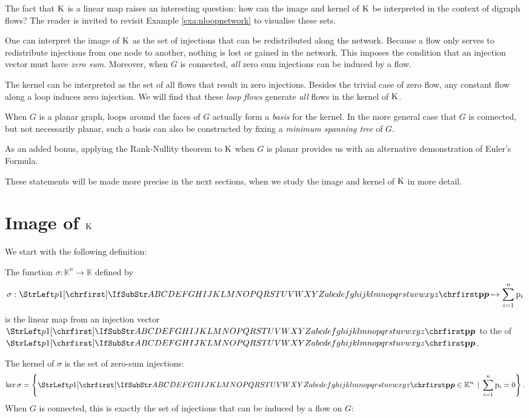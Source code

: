 \documentclass[main.tex]{subfiles}
\begin{document}
The fact that $\text{\textup{K}}$ is a linear map raises an interesting question: how can the image and kernel of $\text{\textup{K}}$ be interpreted in the context of digraph flows?
The reader is invited to revisit Example \ref{exa:nloopnetwork} to visualise these sets.

One can interpret the image of $\text{\textup{K}}$ as the set of injections that can be redistributed along the network. Because a flow only serves to redistribute injections from one node to another, nothing is lost or gained in the network. This imposes the condition that an injection vector must have \emph{zero sum}. Moreover, when $G$ is connected, \emph{all} zero sum injections can be induced by a flow.

The kernel can be interpreted as the set of all flows that result in zero injections. Besides the trivial case of zero flow, any constant flow along a loop induces zero injection. We will find that these \emph{loop flows} generate \emph{all} flows in the kernel of $\text{\textup{K}}$.

When $G$ is a planar graph, loops around the faces of $G$ actually form a \emph{basis} for the kernel. In the more general case that $G$ is connected, but not necessarily planar, such a basis can also be constructed by fixing a \emph{minimum spanning tree} of $G$.

As an added bonus, applying the Rank-Nullity theorem to $\text{\textup{K}}$ when $G$ is planar provides us with an alternative demonstration of Euler's Formula.

These statements will be made more precise in the next sections, when we study the image and kernel of $\text{\textup{K}}$ in more detail.

\section{Image of $\mathbf{\text{\textup{K}}}$}
We start with the following definition:
\begin{definition}
The function $\sigma : \mathbb{K}^n \rightarrow \mathbb{K}$ defined by
\begin{gather*}
    \sigma : \mat{p} \mapsto \sum_{i=1}^n \mel{p}_i
\end{gather*}
is the linear map from an injection vector $\mat{p}$ to the  of $\mat{p}$.
\end{definition}
The kernel of $\sigma$ is the set of zero-sum injections:
$$\ker \sigma = \left\{ \mat{p} \in \mathbb{K}^n \, \mid \, \sum_{i=1}^n \mel{p}_i = 0 \right\}.$$
When $G$ is connected, this is exactly the set of injections that can be induced by a flow on $G$:
\end{document}
